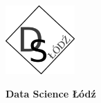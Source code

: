 \documentclass[\main/boa.tex]{subfiles}
\begin{document}
	
	\begin{minipage}[t]{0.915\textwidth}
		\center     
		\includegraphics[width=100px]{img/logos.bw/ds_lodz.png} 
	\end{minipage}
	\begin{center}
	\Large \textbf {Data Science Łódź}
	\end{center}
	
	\vskip 0.3cm
	\normalsize 
\vskip 1.5cm
\end{document}
